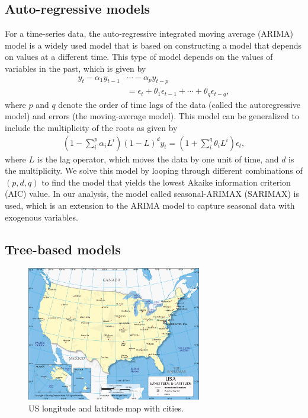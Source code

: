 \documentclass[prl,aps,superscriptaddress,twocolumn,10pt,nolongbibliography]{revtex4-2}
\begin{document}
\subsection{Auto-regressive models}
For a time-series data, the auto-regressive integrated moving average (ARIMA) model is a widely used model that is based on constructing a model that depends on values at a different time. 
This type of model depends on the values of variables in the past, which is given by 
\begin{align}
y_t - \alpha_1 y_{t-1} &\cdots - \alpha_p y_{t-p} \nonumber \\
&= \epsilon_t + \theta_1 \epsilon_{t-1} + \cdots + \theta_q \epsilon_{t-q},
\end{align}
where $p$ and $q$ denote the order of time lags of the data (called the autoregressive model) and errors (the moving-average model). 
This model can be generalized to include the multiplicity of the roots as given by 
\begin{align}
(1 - \sum_i^p \alpha_i L^i) (1 - L)^d y_t = (1 + \sum_i^q \theta_i L^i) \epsilon_t, \label{eq:arima}
\end{align}
where $L$ is the lag operator, which moves the data by one unit of time, and $d$ is the multiplicity. 
We solve this model by looping through different combinations of $(p, d, q)$ to find the model that yields the lowest Akaike information criterion (AIC) value. 
In our analysis, the model called seasonal-ARIMAX (SARIMAX) is used, which is an extension to the ARIMA model to capture seasonal data with exogenous variables.

\subsection{Tree-based models}
\begin{figure}
\includegraphics[width=3in]{figs/geomap.jpg}
\caption{\label{fig:geomap}
US longitude and latitude map with cities.
}
\end{figure}
\end{document}
